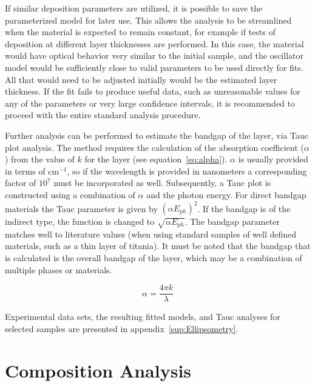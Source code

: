 If similar deposition parameters are utilized, it is possible to save the parameterized model for later use. This allows the analysis to be streamlined when the material is expected to remain constant, for example if tests of deposition at different layer thicknesses are performed. In this case, the material would have optical behavior very similar to the initial sample, and the oscillator model would be sufficiently close to valid parameters to be used directly for fits. All that would need to be adjusted initially would be the estimated layer thickness. If the fit fails to produce useful data, such as unreasonable values for any of the parameters or very large confidence intervals, it is recommended to proceed with the entire standard analysis procedure. 

Further analysis can be performed to estimate the bandgap of the layer, via Tauc plot analysis.\cite{tauc_optical_1968,ablees_optical_1972,Bruzzese_2010} The method requires the calculation of the absorption coefficient ($\alpha$) from the value of $k$ for the layer (see equation~\vref{eq:alpha}). $\alpha$ is usually provided in terms of cm$^{-1}$, so if the wavelength is provided in nanometers a corresponding factor of $10^{7}$ must be incorporated as well. Subsequently, a Tauc plot is constructed using a combination of $\alpha$ and the photon energy. For direct bandgap materials the Tauc parameter is given by $\left(\alpha E_{ph}\right)^{2}$.\cite{tauc_optical_1968,ablees_optical_1972,Bruzzese_2010} If the bandgap is of the indirect type, the function is changed to $\sqrt{\alpha E_{ph}}$. The bandgap parameter matches well to literature values (when using standard samples of well defined materials, such as a thin layer of titania). It must be noted that the bandgap that is calculated is the overall bandgap of the layer, which may be a combination of multiple phases or materials.\cite{tauc_optical_1968,ablees_optical_1972,Bruzzese_2010}

\begin{equation}
	\label{eq:alpha}%
	\alpha = \frac{4\pi k}{\lambda}
\end{equation}

Experimental data sets, the resulting fitted models, and Tauc analyses for selected samples are presented in appendix~\vref{sup:Ellipsometry}.


\section{Composition Analysis}
\label{sec:Methods-Comp}

